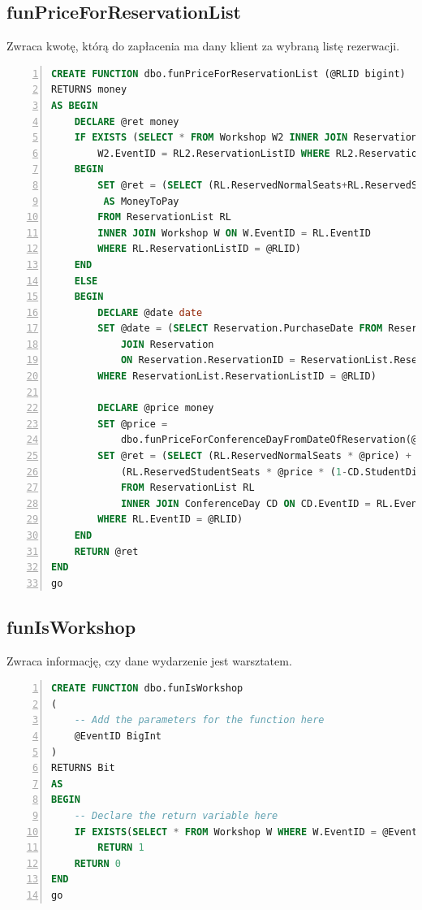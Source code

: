 \documentclass[]{article}
\begin{document}
	\subsection{funPriceForReservationList}
	Zwraca kwotę, którą do zapłacenia ma dany klient za wybraną listę rezerwacji.
	\begin{lstlisting}[language=SQL,
	showspaces=false,
	basicstyle=\ttfamily,
	numbers=left,
	numberstyle=\tiny,
	tabsize=2,
	backgroundcolor=\color{lightg},
	keywordstyle=\color{lightblue},
	commentstyle=\color{gray}]
CREATE FUNCTION dbo.funPriceForReservationList (@RLID bigint)
RETURNS money
AS BEGIN
	DECLARE @ret money
	IF EXISTS (SELECT * FROM Workshop W2 INNER JOIN ReservationList RL2 ON
		W2.EventID = RL2.ReservationListID WHERE RL2.ReservationListID = @RLID)
	BEGIN
		SET @ret = (SELECT (RL.ReservedNormalSeats+RL.ReservedStudentSeats)*W.Price
		 AS MoneyToPay
		FROM ReservationList RL
		INNER JOIN Workshop W ON W.EventID = RL.EventID
		WHERE RL.ReservationListID = @RLID)
	END
	ELSE
	BEGIN
		DECLARE @date date
		SET @date = (SELECT Reservation.PurchaseDate FROM ReservationList
			JOIN Reservation
			ON Reservation.ReservationID = ReservationList.ReservationID
		WHERE ReservationList.ReservationListID = @RLID)
	
		DECLARE @price money
		SET @price =
			dbo.funPriceForConferenceDayFromDateOfReservation(@RLID, @date)
		SET @ret = (SELECT (RL.ReservedNormalSeats * @price) +
			(RL.ReservedStudentSeats * @price * (1-CD.StudentDiscount))
			FROM ReservationList RL
			INNER JOIN ConferenceDay CD ON CD.EventID = RL.EventID
		WHERE RL.EventID = @RLID)
	END
	RETURN @ret
END
go
	\end{lstlisting}
	
	\subsection{funIsWorkshop}
Zwraca informację, czy dane wydarzenie jest warsztatem.
	\begin{lstlisting}[language=SQL,
	showspaces=false,
	basicstyle=\ttfamily,
	numbers=left,
	numberstyle=\tiny,
	tabsize=2,
	backgroundcolor=\color{lightg},
	keywordstyle=\color{lightblue},
	commentstyle=\color{gray}]
CREATE FUNCTION dbo.funIsWorkshop
(
	-- Add the parameters for the function here
	@EventID BigInt
)
RETURNS Bit
AS
BEGIN
	-- Declare the return variable here
	IF EXISTS(SELECT * FROM Workshop W WHERE W.EventID = @EventID)
		RETURN 1
	RETURN 0
END
go

\end{lstlisting}
\end{document}
